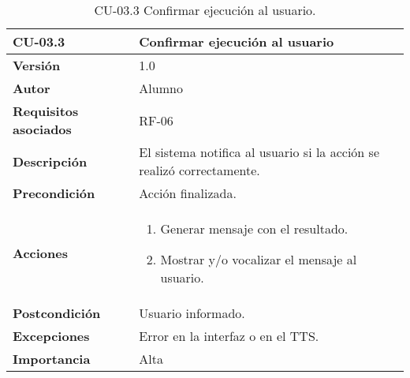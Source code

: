 \begin{table}[p]
    \centering
    \begin{tabularx}{\linewidth}{ p{} p{} }
        \toprule
        \textbf{CU-03.3}    & \textbf{Confirmar ejecución al usuario}\\
        \toprule
        \textbf{Versión}              & 1.0 \\
        \textbf{Autor}                & Alumno \\
        \textbf{Requisitos asociados} & RF-06 \\
        \textbf{Descripción}          & El sistema notifica al usuario si la acción se realizó correctamente.\\
        \textbf{Precondición}         & Acción finalizada.\\
        \textbf{Acciones}             &
        \begin{enumerate}
          \item Generar mensaje con el resultado.
          \item Mostrar y/o vocalizar el mensaje al usuario.
        \end{enumerate}\\
        \textbf{Postcondición}        & Usuario informado.\\
        \textbf{Excepciones}          & Error en la interfaz o en el TTS.\\
        \textbf{Importancia}          & Alta \\
        \bottomrule
    \end{tabularx}
    \caption{CU-03.3 Confirmar ejecución al usuario.}
    \label{CU-03.3 Confirmar ejecucion al usuario}
\end{table}






